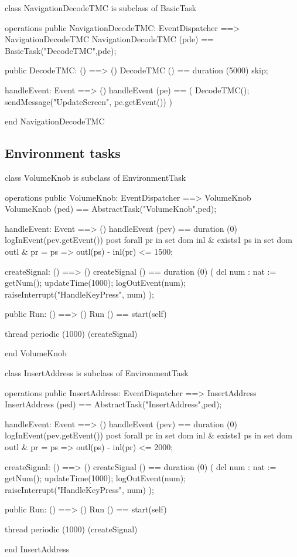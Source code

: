 \begin{vdm_al}
class NavigationDecodeTMC
  is subclass of BasicTask

operations
  public NavigationDecodeTMC: EventDispatcher ==> NavigationDecodeTMC
  NavigationDecodeTMC (pde) == BasicTask("DecodeTMC",pde);

  public DecodeTMC: () ==> ()
  DecodeTMC () == duration (5000) skip;

  handleEvent: Event ==> ()
  handleEvent (pe) ==
    ( DecodeTMC();
      sendMessage("UpdateScreen", pe.getEvent()) )

end NavigationDecodeTMC
\end{vdm_al}

\subsection{Environment tasks}

\begin{vdm_al}
class VolumeKnob
  is subclass of EnvironmentTask

operations
  public VolumeKnob: EventDispatcher ==> VolumeKnob
  VolumeKnob (ped) == AbstractTask("VolumeKnob",ped);

  handleEvent: Event ==> ()
  handleEvent (pev) == duration (0) logInEvent(pev.getEvent())
  post forall pr in set dom inl &
         exists1 ps in set dom outl &
           pr = ps => outl(ps) - inl(pr) <= 1500;

  createSignal: () ==> ()
  createSignal () ==
    duration (0)
     ( dcl num : nat := getNum();
       updateTime(1000);
       logOutEvent(num);
       raiseInterrupt("HandleKeyPress", num) );

  public Run: () ==> ()
  Run () == start(self)

thread
  periodic (1000) (createSignal)
  
end VolumeKnob
\end{vdm_al}

\begin{vdm_al}
class InsertAddress
  is subclass of EnvironmentTask

operations
  public InsertAddress: EventDispatcher ==> InsertAddress
  InsertAddress (ped) == AbstractTask("InsertAddress",ped);

  handleEvent: Event ==> ()
  handleEvent (pev) == duration (0) logInEvent(pev.getEvent())
  post forall pr in set dom inl &
         exists1 ps in set dom outl &
           pr = ps => outl(ps) - inl(pr) <= 2000;

  createSignal: () ==> ()
  createSignal () ==
    duration (0)
      ( dcl num : nat := getNum();
	updateTime(1000);
        logOutEvent(num);
        raiseInterrupt("HandleKeyPress", num) );

  public Run: () ==> ()
  Run () == start(self)

thread
  periodic (1000) (createSignal)
  
end InsertAddress
\end{vdm_al}

